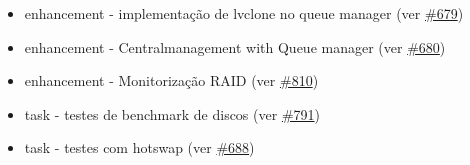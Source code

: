 \begin{itemize}
	\item enhancement - implementação de lvclone no queue manager (ver \href{https://srcmaster.eurotux.com/pm/p/etva/ticket/679}{\#679})
	\item enhancement - Centralmanagement with Queue manager (ver \href{https://srcmaster.eurotux.com/pm/p/etva/ticket/680}{\#680})
	\item enhancement - Monitorização RAID (ver \href{https://srcmaster.eurotux.com/pm/p/etva/ticket/810}{\#810})
	\item task - testes de benchmark de discos (ver \href{https://srcmaster.eurotux.com/pm/p/etva/ticket/791}{\#791})
	\item task - testes com hotswap (ver \href{https://srcmaster.eurotux.com/pm/p/etva/ticket/688}{\#688})
\end{itemize}

